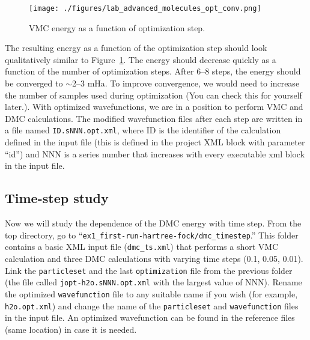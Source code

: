 \begin{figure}
\begin{center}
\texttt{[image: ./figures/lab\_advanced\_molecules\_opt\_conv.png]}
\end{center}
\caption{VMC energy as a function of optimization step.}
\label{fig:lam_opt_conv}
\end{figure}

The resulting energy as a function of the optimization step should look qualitatively similar to Figure~\ref{fig:lam_opt_conv}.
The energy should decrease quickly as a function of the number of optimization steps. After 6--8 steps, the energy should be converged to $\sim$2--3 mHa. To improve convergence,
we would need to increase the number of samples used during optimization (You can
check this for yourself later.). With optimized wavefunctions, we are in a position
to perform VMC and DMC calculations. The modified wavefunction files after each step
are written in a file named \texttt{ID.sNNN.opt.xml}, where ID is the identifier of the calculation
defined in the input file (this is defined in the project XML block with parameter “id”) and
NNN is a series number that increases with every executable xml block in the input file.


\subsection{Time-step study}
Now we will study the dependence of the DMC energy with time step. From the top directory, 
go to “\texttt{ex1\_first-run-hartree-fock/dmc\_timestep}.” This folder contains a basic XML input
file (\texttt{dmc\_ts.xml}) that performs a short VMC calculation and three DMC calculations
with varying time steps (0.1, 0.05, 0.01). Link the \texttt{particleset} and the last \texttt{optimization}
file from the previous folder (the file called \texttt{jopt-h2o.sNNN.opt.xml} with the largest value of
NNN). Rename the optimized \texttt{wavefunction} file to any suitable name if you wish (for example,
\texttt{h2o.opt.xml}) and change the name of the \texttt{particleset} and \texttt{wavefunction} files in the
input file. An optimized wavefunction can be found in the reference files (same location)
in case it is needed. %

